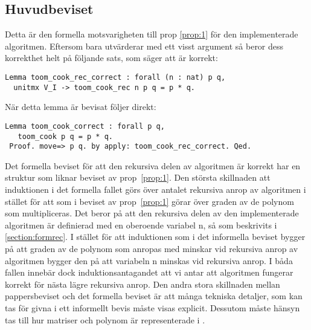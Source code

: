 \subsection{Huvudbeviset}
Detta är den formella motsvarigheten till prop \ref{prop:1} för den
implementerade algoritmen. Eftersom  bara utvärderar
 med ett visst argument så beror dess korrekthet helt på
följande sats, som säger att  är korrekt:
\begin{lstlisting}
Lemma toom_cook_rec_correct : forall (n : nat) p q,
  unitmx V_I -> toom_cook_rec n p q = p * q.
\end{lstlisting}
När detta lemma är bevisat följer  direkt:
\begin{lstlisting}
Lemma toom_cook_correct : forall p q,
   toom_cook p q = p * q.
 Proof. move=> p q. by apply: toom_cook_rec_correct. Qed.
\end{lstlisting}
Det formella beviset för att den rekursiva delen av algoritmen är korrekt har
en struktur som liknar beviset av prop~\ref{prop:1}.
Den största skillnaden att
induktionen i det formella fallet görs över antalet rekursiva anrop av
algoritmen i stället för att som i beviset av prop~\ref{prop:1} görar över
graden av de polynom som multipliceras. Det beror på att den rekursiva delen av
den implementerade algoritmen  är definierad med en oberoende
variabel n, så som beskrivits i \ref{section:formrec}. I stället för att
induktionen som i det informella beviset bygger på att graden av de polynom som
\toom anropas med minskar vid rekursiva anrop av algoritmen bygger den på att
variabeln n minskas vid rekursiva anrop. I båda fallen innebär dock
induktionsantagandet att vi antar att algoritmen fungerar korrekt för nästa
lägre rekursiva anrop.
Den andra stora skillnaden mellan pappersbeviset och det formella beviset är
att många tekniska detaljer, som kan tas för givna i ett informellt bevis måste
visas explicit. Dessutom måste hänsyn tas till hur matriser och polynom är
representerade i \ssr.

